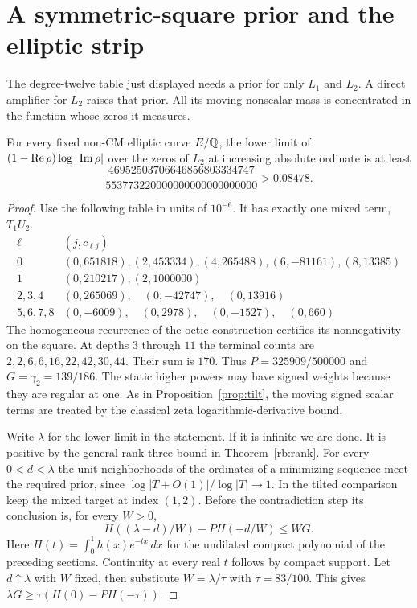 \documentclass[11pt]{article}
\begin{document}
\section{A symmetric-square prior and the elliptic strip}\label{sec:final}
The degree-twelve table just displayed needs a prior for only $L_1$ and $L_2$. A direct amplifier for $L_2$ raises that prior. All its moving nonscalar mass is concentrated in the function whose zeros it measures.
\begin{lemma}\label{squaredirect}
For every fixed non-CM elliptic curve $E/\mathbb Q$, the lower limit of $(1-\operatorname{Re}\rho)\log|\operatorname{Im}\rho|$ over the zeros of $L_2$ at increasing absolute ordinate is at least
\[
 \frac{46952503706646856803334747}{553773220000000000000000000}>0.08478 .
\]
\end{lemma}
\begin{proof}
Use the following table in units of $10^{-6}$. It has exactly one mixed term, $T_1U_2$.
\[
\begin{array}{c|l}
\ell &(j,c_{\ell j})\\\hline
0&(0,651818),(2,453334),(4,265488),(6,-81161),(8,13385)\\
1&(0,210217),(2,1000000)\\
2,3,4&(0,265069),\quad(0,-42747),\quad(0,13916)\\
5,6,7,8&(0,-6009),\quad(0,2978),\quad(0,-1527),\quad(0,660)
\end{array}
\]
The homogeneous recurrence of the octic construction certifies its nonnegativity on the square. At depths $3$ through $11$ the terminal counts are $2,2,6,6,16,22,42,30,44$. Their sum is $170$. Thus $P=325909/500000$ and $G=\gamma_2=139/186$. The static higher powers may have signed weights because they are regular at one. As in Proposition~\ref{prop:tilt}, the moving signed scalar terms are treated by the classical zeta logarithmic-derivative bound.

Write $\lambda$ for the lower limit in the statement. If it is infinite we are done. It is positive by the general rank-three bound in Theorem~\ref{rb:rank}. For every $0<d<\lambda$ the unit neighborhoods of the ordinates of a minimizing sequence meet the required prior, since $\log|T+O(1)|/\log|T|\to1$. In the tilted comparison keep the mixed target at index $(1,2)$. Before the contradiction step its conclusion is, for every $W>0$,
\[
 H((\lambda-d)/W)-PH(-d/W)\le WG.
\]
Here $H(t)=\int_0^1h(x)e^{-tx}\,dx$ for the undilated compact polynomial of the preceding sections. Continuity at every real $t$ follows by compact support. Let $d\uparrow\lambda$ with $W$ fixed, then substitute $W=\lambda/\tau$ with $\tau=83/100$. This gives $\lambda G\ge\tau(H(0)-P H(-\tau))$.


\end{proof}
\end{document}
